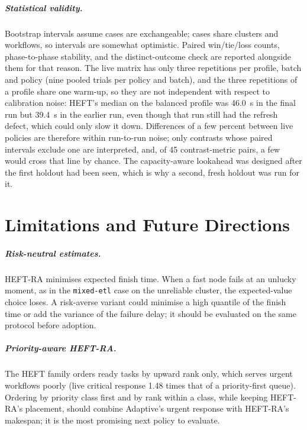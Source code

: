 \documentclass[12pt,a4paper]{report}
\begin{document}
\paragraph{Statistical validity.} Bootstrap intervals assume cases are
exchangeable; cases share clusters and workflows, so intervals are
somewhat optimistic. Paired win/tie/loss counts, phase-to-phase stability,
and the distinct-outcome check are reported alongside them for that
reason. The live matrix has only three repetitions per profile, batch and
policy (nine pooled trials per policy and batch), and the three
repetitions of a profile share one warm-up, so they are not independent
with respect to calibration noise: HEFT's median on the balanced profile
was 46.0~s in the final run but 39.4~s in the earlier run, even though
that run still had the refresh defect, which could only slow it down. Differences of a few
percent between live policies are therefore within run-to-run noise; only
contrasts whose paired intervals exclude one are interpreted, and, of 45
contrast-metric pairs, a few would cross that line by chance. The
capacity-aware lookahead was designed after the first holdout had been
seen, which is why a second, fresh holdout was run for it.

\chapter{Limitations and Future Directions}
\label{ch:limits}

\paragraph{Risk-neutral estimates.} HEFT-RA minimises expected finish
time. When a fast node fails at an unlucky moment, as in the
\texttt{mixed-etl} case on the unreliable cluster, the expected-value
choice loses. A risk-averse variant could minimise a high quantile of the
finish time or add the variance of the failure delay; it should be
evaluated on the same protocol before adoption.

\paragraph{Priority-aware HEFT-RA.} The HEFT family orders ready tasks by
upward rank only, which serves urgent workflows poorly (live critical
response 1.48 times that of a priority-first queue). Ordering by priority
class first and by rank within a class, while keeping HEFT-RA's placement,
should combine Adaptive's urgent response with HEFT-RA's makespan; it is
the most promising next policy to evaluate.
\end{document}
